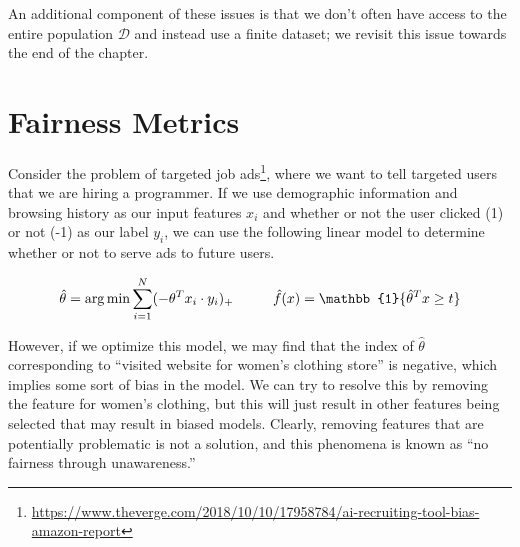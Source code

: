 An additional component of these issues is that we don't often have access to the entire population $\mathcal D$ and instead use a finite dataset; we revisit this issue towards the end of the chapter.





\section{Fairness Metrics}

Consider the problem of targeted job ads\footnote{\url{https://www.theverge.com/2018/10/10/17958784/ai-recruiting-tool-bias-amazon-report}}, where we want to tell targeted users that we are hiring a programmer. If we use demographic information and browsing history as our input features $x_i$ and whether or not the user clicked (1) or not (-1) as our label $y_i$, we can use the following linear model to determine whether or not to serve ads to future users.

$$\hat{\theta} = \argmin \sum_{i=1}^{N} (-\theta^Tx_i \cdot y_i)_+ \hspace{1cm} \hat{f}(x) = \mathbb{1} \{\hat{\theta}^Tx \ge t\}$$

However, if we optimize this model, we may find that the index of $\hat{\theta}$ corresponding to ``visited website for women's clothing store'' is negative, which implies some sort of bias in the model. We can try to resolve this by removing the feature for women's clothing, but this will just result in other features being selected that may result in biased models. Clearly, removing features that are potentially problematic is not a solution, and this phenomena is known as ``no fairness through unawareness.'' 


